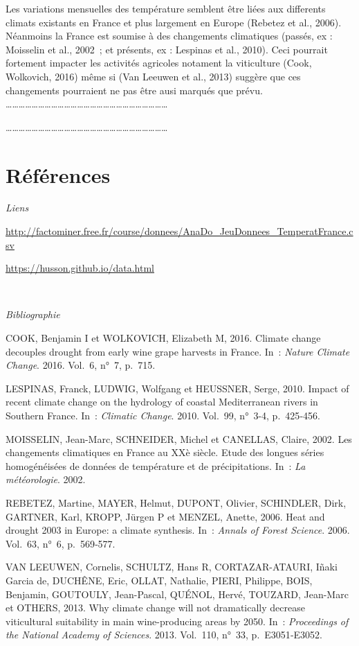 \documentclass[
]{article}
\begin{document}
Les variations mensuelles des température semblent être liées aux
differents climats existants en France et plus largement en Europe
(Rebetez et al., 2006). Néanmoins la France est soumise à des
changements climatiques (passés, ex : Moisselin et al., 2002~; et
présents, ex : Lespinas et al., 2010). Ceci pourrait fortement impacter
les activités agricoles notament la viticulture (Cook, Wolkovich, 2016)
même si (Van Leeuwen et al., 2013) suggère que ces changements
pourraient ne pas être ausi marqués que prévu.
\ldots\ldots\ldots\ldots\ldots\ldots\ldots\ldots\ldots\ldots\ldots\ldots\ldots\ldots\ldots\ldots\ldots\ldots\ldots\ldots\ldots\ldots\ldots\ldots\ldots{}

\ldots\ldots\ldots\ldots\ldots\ldots\ldots\ldots\ldots\ldots\ldots\ldots\ldots\ldots\ldots\ldots\ldots\ldots\ldots\ldots\ldots\ldots\ldots\ldots\ldots{}

\hypertarget{ruxe9fuxe9rences}{%
\section{\texorpdfstring{\textbf{Références}}{Références}}\label{ruxe9fuxe9rences}}

\emph{Liens}

\url{http://factominer.free.fr/course/donnees/AnaDo_JeuDonnees_TemperatFrance.csv}

\url{https://husson.github.io/data.html}

~

\emph{Bibliographie}

\hypertarget{refs}{}
\leavevmode\hypertarget{ref-cook2016climate}{}%
COOK, Benjamin I et WOLKOVICH, Elizabeth M, 2016. Climate change
decouples drought from early wine grape harvests in France. In~:
\emph{Nature Climate Change}. 2016. Vol.~6, n°~7, p.~715.

\leavevmode\hypertarget{ref-lespinas2010impact}{}%
LESPINAS, Franck, LUDWIG, Wolfgang et HEUSSNER, Serge, 2010. Impact of
recent climate change on the hydrology of coastal Mediterranean rivers
in Southern France. In~: \emph{Climatic Change}. 2010. Vol.~99, n°~3-4,
p.~425‑456.

\leavevmode\hypertarget{ref-moisselin2002changements}{}%
MOISSELIN, Jean-Marc, SCHNEIDER, Michel et CANELLAS, Claire, 2002. Les
changements climatiques en France au XXè siècle. Etude des longues
séries homogénéisées de données de température et de précipitations.
In~: \emph{La météorologie}. 2002.

\leavevmode\hypertarget{ref-rebetez2006heat}{}%
REBETEZ, Martine, MAYER, Helmut, DUPONT, Olivier, SCHINDLER, Dirk,
GARTNER, Karl, KROPP, Jürgen P et MENZEL, Anette, 2006. Heat and drought
2003 in Europe: a climate synthesis. In~: \emph{Annals of Forest
Science}. 2006. Vol.~63, n°~6, p.~569‑577.

\leavevmode\hypertarget{ref-van2013climate}{}%
VAN LEEUWEN, Cornelis, SCHULTZ, Hans R, CORTAZAR-ATAURI, Iñaki Garcia
de, DUCHÊNE, Eric, OLLAT, Nathalie, PIERI, Philippe, BOIS, Benjamin,
GOUTOULY, Jean-Pascal, QUÉNOL, Hervé, TOUZARD, Jean-Marc et OTHERS,
2013. Why climate change will not dramatically decrease viticultural
suitability in main wine-producing areas by 2050. In~: \emph{Proceedings
of the National Academy of Sciences}. 2013. Vol.~110, n°~33,
p.~E3051‑E3052.
\end{document}
